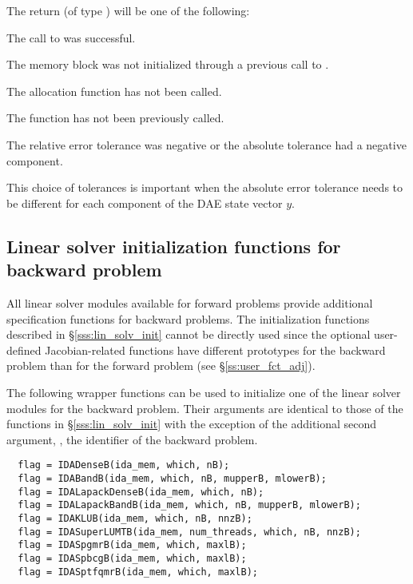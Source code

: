 {
  The return  (of type ) will be one of the following:
  \begin{args}
  \item[\Id{IDA\_SUCCESS}]
    The call to  was successful.
  \item[\Id{IDA\_MEM\_NULL}] 
    The {\idas} memory block was not initialized through a previous call to
    .
  \item[\Id{IDA\_NO\_MALLOC}] 
    The allocation function  has not been called.
  \item[\Id{IDA\_NO\_ADJ}]
    The function  has not been previously called.
  \item[\Id{IDA\_ILL\_INPUT}] 
    The relative error tolerance was negative or the absolute tolerance
    had a negative component.
  \end{args}
}
{
  This choice of tolerances is important when the absolute error tolerance needs to
  be different for each component of the DAE state vector $y$.
}

\subsection{Linear solver initialization functions for backward problem}
\label{sss:lin_solv_b}

All {\idas} linear solver modules available for forward problems
provide additional specification functions for backward problems.  The
initialization functions described in \S\ref{sss:lin_solv_init} cannot
be directly used since the optional user-defined Jacobian-related
functions have different prototypes for the backward problem than for
the forward problem (see \S\ref{ss:user_fct_adj}).

The following wrapper functions can be used to initialize one of the linear
solver modules for the backward problem. Their arguments are identical to those
of the functions in \S\ref{sss:lin_solv_init} with the exception of the additional
second argument, , the identifier of the backward problem.
\begin{verbatim}
  flag = IDADenseB(ida_mem, which, nB);
  flag = IDABandB(ida_mem, which, nB, mupperB, mlowerB);
  flag = IDALapackDenseB(ida_mem, which, nB);
  flag = IDALapackBandB(ida_mem, which, nB, mupperB, mlowerB);
  flag = IDAKLUB(ida_mem, which, nB, nnzB);
  flag = IDASuperLUMTB(ida_mem, num_threads, which, nB, nnzB);
  flag = IDASpgmrB(ida_mem, which, maxlB);
  flag = IDASpbcgB(ida_mem, which, maxlB);
  flag = IDASptfqmrB(ida_mem, which, maxlB);
\end{verbatim}


